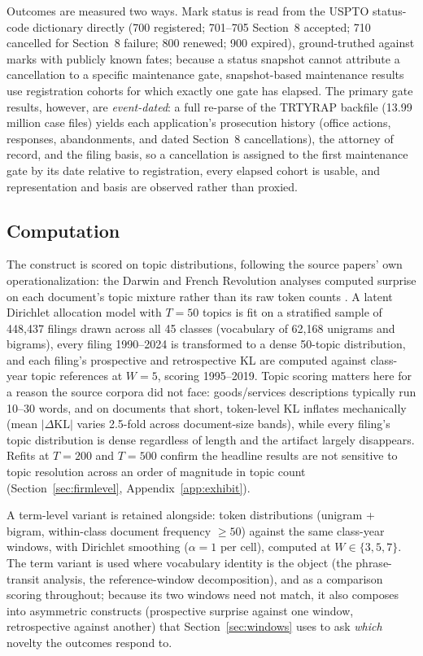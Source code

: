 \documentclass[11pt]{article}
\begin{document}
Outcomes are measured two ways. Mark status is read from the USPTO
status-code dictionary directly (700 registered; 701--705 Section~8
accepted; 710 cancelled for Section~8 failure; 800 renewed; 900 expired),
ground-truthed against marks with publicly known fates; because a status
snapshot cannot attribute a cancellation to a specific maintenance gate,
snapshot-based maintenance results use registration cohorts for which
exactly one gate has elapsed. The primary gate results, however, are
\emph{event-dated}: a full re-parse of the TRTYRAP backfile (13.99
million case files) yields each application's prosecution history
(office actions, responses, abandonments, and dated Section~8
cancellations), the attorney of record, and the filing basis, so a
cancellation is assigned to the first maintenance gate by its date
relative to registration, every elapsed cohort is usable, and
representation and basis are observed rather than proxied.

\subsection{Computation}

The construct is scored on topic distributions, following the source
papers' own operationalization: the Darwin and French Revolution analyses
computed surprise on each document's topic mixture rather than its raw
token counts \citep{Murdock2017, Barron2018}. A latent Dirichlet
allocation model with $T = 50$ topics is fit on a stratified sample of
448{,}437 filings drawn across all 45 classes (vocabulary of 62{,}168
unigrams and bigrams), every filing 1990--2024 is transformed to a dense
50-topic distribution, and each filing's prospective and retrospective KL
are computed against class-year topic references at $W = 5$, scoring
1995--2019. Topic scoring matters here for a reason the source corpora
did not face: goods/services descriptions typically run 10--30 words, and
on documents that short, token-level KL inflates mechanically (mean
$|\Delta\mathrm{KL}|$ varies 2.5-fold across document-size bands), while
every filing's topic distribution is dense regardless of length and the
artifact largely disappears. Refits at $T = 200$ and $T = 500$ confirm the
headline results are not sensitive to topic resolution across an order of
magnitude in topic count (Section~\ref{sec:firmlevel},
Appendix~\ref{app:exhibit}).

A term-level variant is retained alongside: token distributions
(unigram + bigram, within-class document frequency $\geq 50$) against the
same class-year windows, with Dirichlet smoothing ($\alpha = 1$ per
cell), computed at $W \in \{3, 5, 7\}$. The term variant is used where
vocabulary identity is the object (the phrase-transit analysis, the
reference-window decomposition), and
as a comparison scoring throughout; because its two windows need not
match, it also composes into asymmetric constructs (prospective surprise
against one window, retrospective against another) that
Section~\ref{sec:windows} uses to ask \emph{which} novelty the outcomes
respond to.
\end{document}
